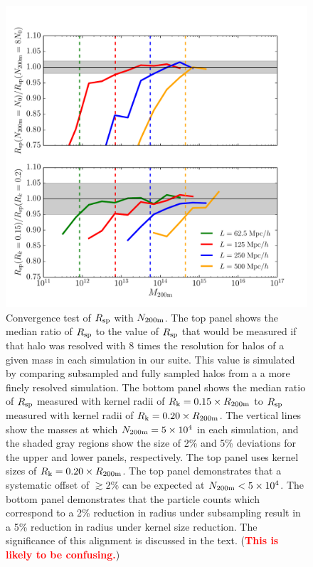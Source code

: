 \documentclass[numberedappendix,apj]{emulateapj}
\begin{document}
\begin{figure}
   \centering
   \includegraphics[width=\columnwidth]{m200_rsp_convergence.pdf}
   \caption{Convergence test of $R_{\rm sp}$ with $N_{\rm 200m}$. The top panel
       shows the median ratio of $R_{\rm sp}$ to the value of $R_{\rm sp}$ that
       would be measured if that halo was resolved with 8 times the resolution
       for halos of a given mass in each simulation in our suite. This value
       is simulated by comparing subsampled and fully sampled halos from a
       a more finely resolved simulation. The bottom panel shows the median
       ratio of $R_{\rm sp}$ measured with kernel radii of
       $R_{\rm k} = 0.15 \times R_{\rm 200m}$ to $R_{\rm sp}$ measured with
       kernel radii of $R_{\rm k} = 0.20 \times R_{\rm 200m}$. The vertical
       lines show the masses at which $N_{\rm 200m} = 5 \times 10^4$ in
       each simulation, and the shaded gray regions show the size of 2\% and
       5\% deviations for the upper and lower panels, respectively. The top
       panel uses kernel sizes of $R_{\rm k} = 0.20 \times R_{\rm 200m}$.
       The top panel demonstrates that a systematic offset of $\gtrsim 2\%$ can 
       be expected at $N_{\rm 200m} < 5\times 10^4$. The bottom panel
       demonstrates that the particle counts which correspond to a 2\% reduction
       in radius under subsampling result in a 5\% reduction in radius under
       kernel size reduction. The significance of this alignment is discussed
       in the text. (\textcolor{red}{\textbf{This is likely to be confusing.}})
   }
        \label{fig:m200_rsp_convergence}
\end{figure}
\end{document}
